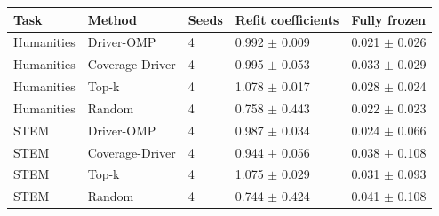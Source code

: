 \begin{tabular}{lllll}
\toprule
Task & Method & Seeds & Refit coefficients & Fully frozen \\
\midrule
Humanities & Driver-OMP & 4 & 0.992 $\pm$ 0.009 & 0.021 $\pm$ 0.026 \\
Humanities & Coverage-Driver & 4 & 0.995 $\pm$ 0.053 & 0.033 $\pm$ 0.029 \\
Humanities & Top-k & 4 & 1.078 $\pm$ 0.017 & 0.028 $\pm$ 0.024 \\
Humanities & Random & 4 & 0.758 $\pm$ 0.443 & 0.022 $\pm$ 0.023 \\
STEM & Driver-OMP & 4 & 0.987 $\pm$ 0.034 & 0.024 $\pm$ 0.066 \\
STEM & Coverage-Driver & 4 & 0.944 $\pm$ 0.056 & 0.038 $\pm$ 0.108 \\
STEM & Top-k & 4 & 1.075 $\pm$ 0.029 & 0.031 $\pm$ 0.093 \\
STEM & Random & 4 & 0.744 $\pm$ 0.424 & 0.041 $\pm$ 0.108 \\
\bottomrule
\end{tabular}
